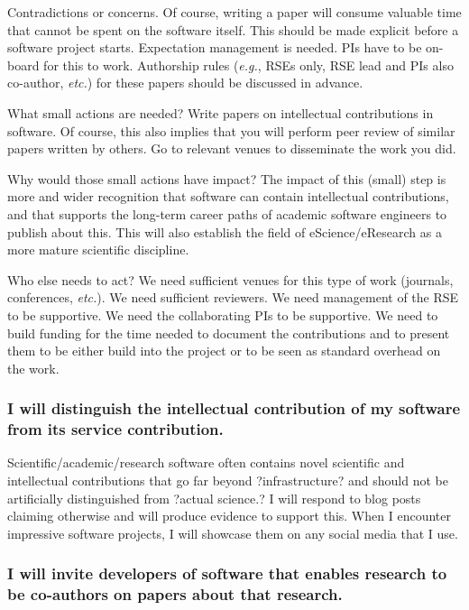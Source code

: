 \documentclass[a4paper,UKenglish]{dagman}
\renewcommand{\paragraph}[1]{\subsubsection*{#1}\xspace}
\newcommand{\eg}{\emph{e.g.},\xspace}
\newcommand{\etc}{\emph{etc.}\xspace}
\begin{document}
Contradictions or concerns.
Of course, writing a paper will consume valuable time that cannot be spent on the software itself. This should be made explicit before a software project starts. Expectation management is needed. PIs have to be on-board for this to work. Authorship rules (\eg RSEs only, RSE lead and PIs also co-author, \etc) for these papers should be discussed in advance.

What small actions are needed?
Write papers on intellectual contributions in software. Of course, this also implies that you will perform peer review of similar papers written by others. Go to relevant venues to disseminate the work you did.

Why would those small actions have impact?
The impact of this (small) step is more and wider recognition that software can contain intellectual contributions, and that supports the long-term career paths of academic software engineers to publish about this. This will also establish the field of eScience/eResearch as a more mature scientific discipline.

Who else needs to act?
We need sufficient venues for this type of work (journals, conferences, \etc).  We need sufficient reviewers.  We need management of the RSE to be supportive.  We need the collaborating PIs to be supportive.  We need to build funding for the time needed to document the contributions and to present them to be either build into the project or to be seen as standard overhead on the work.



\paragraph{I will distinguish the intellectual contribution of my software from its service contribution.}



Scientific/academic/research software often contains novel scientific and intellectual contributions that go far beyond ?infrastructure? and should not be artificially distinguished from ?actual science.? I will respond to blog posts claiming otherwise and will produce evidence to support this. When I encounter impressive software projects, I will showcase them on any social media that I use.

\paragraph{I will invite developers of software that enables research to be co-authors on papers about that research.}
\end{document}
